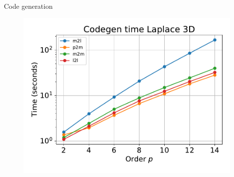 \documentclass[10pt,usenames,dvipsnames]{beamer}
\begin{document}
\begin{frame}[fragile]{Code generation}
\begin{figure}
\includegraphics[scale=0.3]{figures/codegen-time-laplace-3d.pdf}
\end{figure}
\end{frame}
\end{document}
